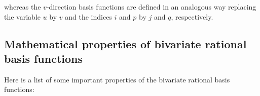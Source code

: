 whereas the $v$-direction basis functions are defined in an analogous way replacing the variable $u$ by $v$ and the indices $i$ and $p$ by $j$ and $q$, respectively.




\subsection{Mathematical properties of bivariate rational basis functions}
Here is a list of some important properties of the bivariate rational basis functions:

